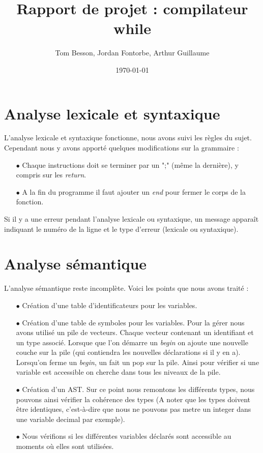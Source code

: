 \documentclass{report}
\title{Rapport de projet : compilateur while}
\author{Tom Besson, Jordan Fontorbe, Arthur Guillaume}
\date{\today}
\begin{document}
\maketitle

\section*{Analyse lexicale et syntaxique}

L'analyse lexicale et syntaxique fonctionne, nous avons suivi les règles du sujet. Cependant nous y avons apporté quelques modifications sur la grammaire :
\begin{itemize}
	\item[$\bullet$] Chaque instructions doit se terminer par un ";" (même la dernière), y compris sur les \emph{return}.
	\item[$\bullet$] A la fin du programme il faut ajouter un \emph{end} pour fermer le corps de la fonction.
\end{itemize}


Si il y a une erreur pendant l'analyse lexicale ou syntaxique, un message apparaît indiquant le numéro de la ligne et le type d'erreur (lexicale ou syntaxique).

\section*{Analyse sémantique}

L'analyse sémantique reste incomplète. Voici les points que nous avons traité :

\begin{itemize}
	\item[$\bullet$] Création d'une table d'identificateurs pour les variables.
	\item[$\bullet$] Création d'une table de symboles pour les variables. Pour la gérer nous avons utilisé un pile de vecteurs. Chaque vecteur contenant un identifiant et un type associé. Lorsque que l'on démarre un \emph{begin} on ajoute une nouvelle couche sur la pile (qui contiendra les nouvelles déclarations si il y en a). Lorsqu'on ferme un \emph{begin}, un fait un pop sur la pile. Ainsi pour vérifier si une variable est accessible on cherche dans tous les niveaux de la pile.
	\item[$\bullet$] Création d'un AST. Sur ce point nous remontons les différents types, nous pouvons ainsi vérifier la cohérence des types (A noter que les types doivent être identiques, c'est-à-dire que nous ne pouvons pas metre un integer dans une variable decimal par exemple).
	\item[$\bullet$] Nous vérifions si les différentes variables déclarés sont accessible au moments où elles sont utilisées.
\end{itemize}
\end{document}
